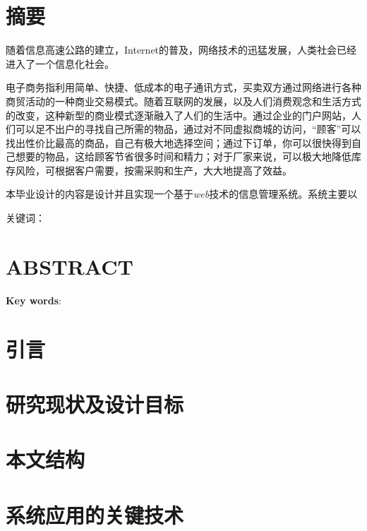 \documentclass[
]{article}
\author{}
\date{}
\begin{document}
\hypertarget{ux6458ux8981}{%
\section{\texorpdfstring{\textbf{摘要}}{摘要}}\label{ux6458ux8981}}

随着信息高速公路的建立，Internet的普及，网络技术的迅猛发展，人类社会已经进入了一个信息化社会。

电子商务指利用简单、快捷、低成本的电子通讯方式，买卖双方通过网络进行各种商贸活动的一种商业交易模式。随着互联网的发展，以及人们消费观念和生活方式的改变，这种新型的商业模式逐渐融入了人们的生活中。通过企业的门户网站，人们可以足不出户的寻找自己所需的物品，通过对不同虚拟商城的访问，``顾客''可以找出性价比最高的商品，自己有极大地选择空间；通过下订单，你可以很快得到自己想要的物品，这给顾客节省很多时间和精力；对于厂家来说，可以极大地降低库存风险，可根据客户需要，按需采购和生产，大大地提高了效益。

本毕业设计的内容是设计并且实现一个基于\emph{web}技术的信息管理系统。系统主要以

关键词：

\hypertarget{abstract}{%
\section{\texorpdfstring{\textbf{ABSTRACT}}{ABSTRACT}}\label{abstract}}

\textbf{Key words}:

\hypertarget{ux5f15ux8a00}{%
\section{引言}\label{ux5f15ux8a00}}

\hypertarget{ux7814ux7a76ux73b0ux72b6ux53caux8bbeux8ba1ux76eeux6807}{%
\section{研究现状及设计目标}\label{ux7814ux7a76ux73b0ux72b6ux53caux8bbeux8ba1ux76eeux6807}}

\hypertarget{ux672cux6587ux7ed3ux6784}{%
\section{本文结构}\label{ux672cux6587ux7ed3ux6784}}

\hypertarget{ux7cfbux7edfux5e94ux7528ux7684ux5173ux952eux6280ux672f}{%
\section{系统应用的关键技术}\label{ux7cfbux7edfux5e94ux7528ux7684ux5173ux952eux6280ux672f}}
\end{document}
